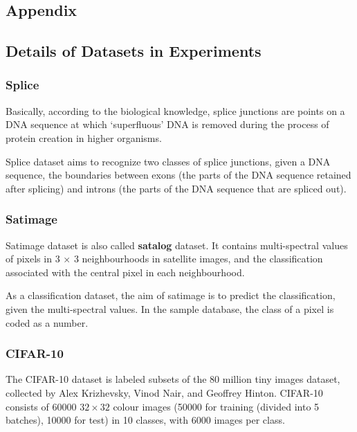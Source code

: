 \documentclass[12pt,a4paper]{article}
\theoremstyle{definition}
\begin{document}
\newpage
\begin{appendix}
\section{Appendix}

\subsection{Details of Datasets in Experiments}
\label{apd:dataset}

\subsubsection{Splice \cite{splice}}

Basically, according to the biological knowledge, splice junctions are points on a DNA sequence at which `superfluous' DNA is removed during the process of protein creation in higher organisms.

\vspace{0.01\linewidth}
Splice dataset aims to recognize two classes of splice junctions, given a DNA sequence, the boundaries between exons (the parts of the DNA sequence retained after splicing) and introns (the parts of the DNA sequence that are spliced out).

\subsubsection{Satimage \cite{satimage}}

Satimage dataset is also called \textbf{satalog} dataset. It contains multi-spectral values of pixels in 3 $\times$ 3 neighbourhoods in satellite images, and the classification associated with the central pixel in each neighbourhood.

\vspace{0.01\linewidth}
As a classification dataset, the aim of satimage is to predict the classification, given the multi-spectral values. In the sample database, the class of a pixel is coded as a number.

\subsubsection{CIFAR-10 \cite{cifar-10}}

The CIFAR-10 dataset is labeled subsets of the 80 million tiny images dataset, collected by Alex Krizhevsky, Vinod Nair, and Geoffrey Hinton. CIFAR-10 consists of 60000 $32 \times 32$ colour images (50000 for training (divided into 5 batches), 10000 for test) in 10 classes, with 6000 images per class.


\end{appendix}
\end{document}
